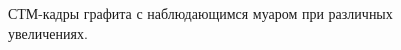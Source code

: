 \documentclass[a4paper, 12pt]{article}
\begin{document}
	\begin{figure}[H]
		\centering
		\caption{СТМ-кадры графита с наблюдающимся муаром при различных увеличениях.}
		\label{fig:2_muar}
	\end{figure}
	
\end{document}
